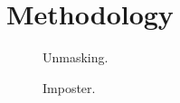 \chapter{Methodology}
\label{chap:methodology}








\begin{figure}[htbp]
    \centering
    
    \caption{Unmasking.}
    \label{fig:unmasking}
\end{figure}

\begin{figure}[htbp]
    \centering
    
    \caption{Imposter.}
    \label{fig:imposter}
\end{figure}
